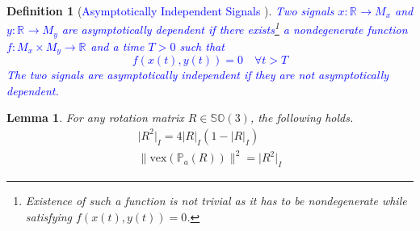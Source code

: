 \documentclass{article}
\newcommand{\SOthree}{\mathbb{SO}(3)}
\newcommand{\R}[1]{\mathbb{R}^{#1}}
\newcommand{\vex}[1]{\text{vex}\left(#1\right)}
\newtheorem{definition}{Definition}
\newtheorem{lemma}{Lemma}
\newcommand{\brackets}[1]{\left(#1\right)}
\newcommand{\textblue}[1]{\textcolor{blue}{#1}}
\newcommand{\normSOthree}[1]{{{\vert}#1 {\vert}_I}}
\begin{document}
\begin{definition}[\textblue{Asymptotically Independent Signals \cite{mahony_complementaryFilter}}]
\textblue{Two signals $x : \R{} \to M_x$ and $y : \R{} \to M_y$ are \emph{asymptotically dependent} if there exists\footnote{Existence of such a function is not trivial as it has to be nondegenerate while satisfying $f(x(t), y(t))= 0$.} a nondegenerate function $f : M_x\times M_y \to \R{}$ and a time $T>0$ such that \[f(x(t), y(t)) = 0 \quad \forall t > T\]
The two signals are asymptotically independent if they are not asymptotically dependent.      }
\end{definition}

\begin{lemma}\label{lemma:1}
    For any rotation matrix $R\in\SOthree$, the following holds. 
    \begin{subequations}
    \begin{align}
        \normSOthree{{R}^2} = 4\normSOthree{{R}}\brackets{1 - \normSOthree{{R}}} \label{eq:lemma1_eq1}\\
        \|\vex{\mathbb{P}_a(R)}\|^2 = \normSOthree{R^2} \label{eq:lemma1_eq2}
    \end{align}
    \end{subequations}
\end{lemma}
\end{document}
